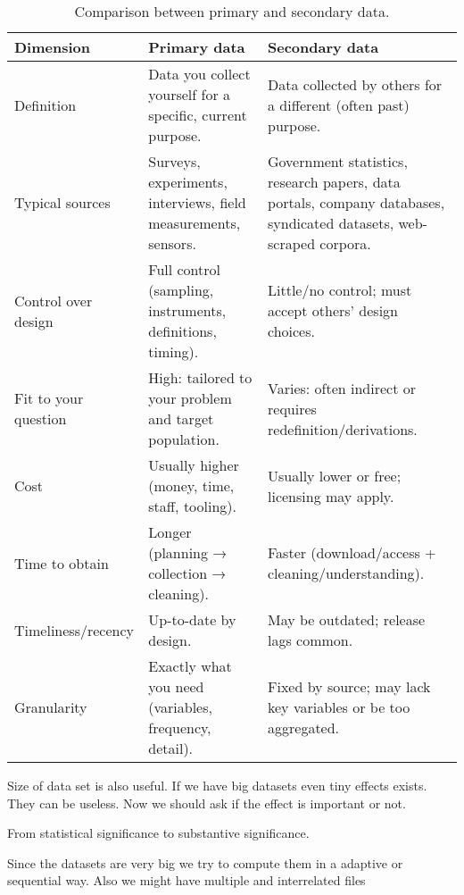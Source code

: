 \begin{table}[h!]
\centering
\scriptsize %
\renewcommand{\arraystretch}{1.1} %
\begin{tabular}{p{2.5cm} p{5cm} p{5cm}}
\hline
\textbf{Dimension} & \textbf{Primary data} & \textbf{Secondary data} \\
\hline
Definition & Data you collect yourself for a specific, current purpose. & Data collected by others for a different (often past) purpose. \\
Typical sources & Surveys, experiments, interviews, field measurements, sensors. & Government statistics, research papers, data portals, company databases, syndicated datasets, web-scraped corpora. \\
Control over design & Full control (sampling, instruments, definitions, timing). & Little/no control; must accept others’ design choices. \\
Fit to your question & High: tailored to your problem and target population. & Varies: often indirect or requires redefinition/derivations. \\
Cost & Usually higher (money, time, staff, tooling). & Usually lower or free; licensing may apply. \\
Time to obtain & Longer (planning → collection → cleaning). & Faster (download/access + cleaning/understanding). \\
Timeliness/recency & Up-to-date by design. & May be outdated; release lags common. \\
Granularity & Exactly what you need (variables, frequency, detail). & Fixed by source; may lack key variables or be too aggregated. \\
\hline
\end{tabular}
\caption{Comparison between primary and secondary data.}
\end{table}


\vspace{20pt}

Size of data set is also useful. If we have big datasets even tiny effects exists. They can be useless. Now we should ask if the effect is important or not. 

\vspace{10pt}

From statistical significance to substantive significance.

\vspace{10pt}

Since the datasets are very big we try to compute them in a adaptive or sequential way. Also we might have multiple and interrelated files

